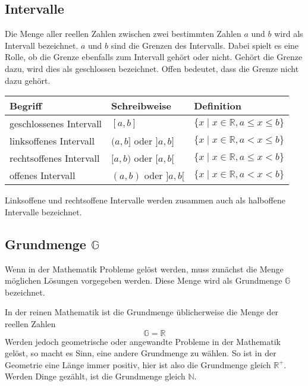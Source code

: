 \subsection{Intervalle}

Die Menge aller reellen Zahlen zwischen zwei bestimmten Zahlen $a$ und $b$ wird als Intervall bezeichnet. $a$ und $b$ sind die Grenzen des Intervalls. Dabei spielt es eine Rolle, ob die Grenze ebenfalls zum Intervall gehört oder nicht. Gehört die Grenze dazu, wird dies als geschlossen bezeichnet. Offen bedeutet, dass die Grenze nicht dazu gehört.

\begin{center}
  \renewcommand{\arraystretch}{1.1}
  \begin{tabularx}{0.9\textwidth}{XXX}
    \textbf{Begriff} & \textbf{Schreibweise} & \textbf{Definition} \\
  \toprule
    geschlossenes Intervall & $[a, b]$ & $\{ x\mid x\in\mathbb{R}, a \leq x \leq b\}$ \\
  \midrule
    linksoffenes Intervall & $(a, b]$ oder $]a, b]$ & $\{ x\mid x\in\mathbb{R}, a< x \leq b\}$ \\
  \midrule
    rechtsoffenes Intervall & $[a, b)$ oder $[a, b[$ & $\{ x\mid x\in\mathbb{R}, a \leq x < b\}$ \\
  \midrule
    offenes Intervall & $(a, b)$ oder $]a, b[$ & $\{ x\mid x\in\mathbb{R}, a< x < b\}$ \\
  \bottomrule
  \end{tabularx}
\end{center}

Linksoffene und rechtsoffene Intervalle werden zusammen auch als halboffene Intervalle bezeichnet.

\subsection{Grundmenge $\mathbb{G}$}

Wenn in der Mathematik Probleme gelöst werden, muss zunächst die Menge möglichen Lösungen vorgegeben werden. Diese Menge wird als Grundmenge $\mathbb{G}$ bezeichnet.

In der reinen Mathematik ist die Grundmenge üblicherweise die Menge der reellen Zahlen
\[
  \mathbb{G} = \mathbb{R}
\]
Werden jedoch geometrische oder angewandte Probleme in der Mathematik gelöst, so macht es Sinn, eine andere Grundmenge zu wählen. So ist in der Geometrie eine Länge immer positiv, hier ist also die Grundmenge gleich $\mathbb{R^{+}}$. Werden Dinge gezählt, ist die Grundmenge gleich $\mathbb{N}$.

